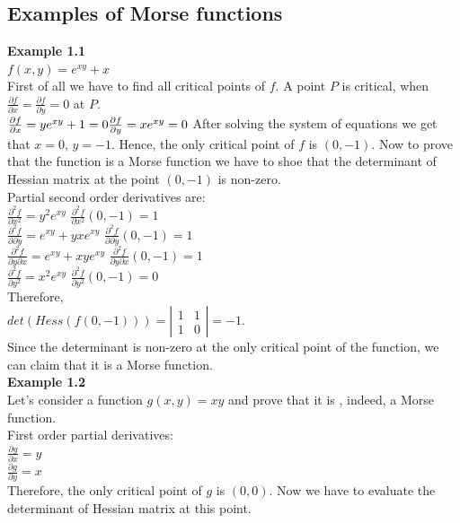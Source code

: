 \documentclass[]{article}
\begin{document}
\subsection{Examples of Morse functions} 
\textbf{Example 1.1}\\
$f(x,y)=e^{xy}+x$\\
First of all we have to find all critical points of $f$. A point $P$ is critical, when $\frac{\partial f}{\partial x}=\frac{\partial f}{\partial y}=0$ at $P$. \\
$\frac{\partial f}{\partial x}= ye^{xy}+1=0 \\
\frac{\partial f}{\partial y}=xe^{xy}=0$
After solving the system of equations we get that $x=0$, $y=-1$. Hence, the only critical point of $f$ is $(0,-1)$. Now to prove that the function is a Morse function we have to shoe that the determinant of Hessian matrix at the point $(0,-1)$ is non-zero. \\
Partial second order derivatives are: \\
$\frac{\partial^2 f}{\partial x^2}=y^2e^{xy}$
$\frac{\partial^2 f}{\partial x^2}(0,-1)=1$\\
$\frac{\partial^2 f}{\partial \partial y}=e^{xy}+yxe^{xy}$
$\frac{\partial^2 f}{\partial \partial y}(0,-1)=1$\\
$\frac{\partial^2 f}{\partial y \partial x}=e^{xy}+xye^{xy}$
$\frac{\partial^2 f}{\partial y \partial x}(0,-1)=1$\\
$\frac{\partial^2 f}{\partial y^2}=x^2e^{xy}$
$\frac{\partial^2 f}{\partial y^2}(0,-1)=0$\\
Therefore, \\
$det(Hess(f(0,-1)))=\left| \begin{array}{cc} 1 & 1 \\ 1 & 0 \end{array} \right|=-1$. \\
Since the determinant is non-zero at the only critical point of the function, we can claim that it is a Morse function. \\
\textbf{Example 1.2}\\
Let's consider a function $g(x,y)=xy$ and prove that it is , indeed, a Morse function.\\
First order partial derivatives: \\
$\frac{\partial g}{\partial x}=y$\\
$\frac{\partial g}{\partial y}=x$\\
Therefore, the only critical point of $g$ is $(0,0)$. Now we have to evaluate the determinant of Hessian matrix at this point.\\
\end{document}
